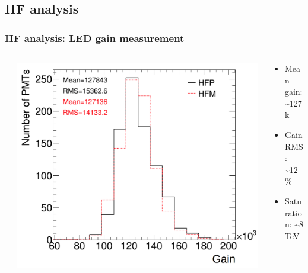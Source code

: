 \documentclass[bigger]{beamer}
\begin{document}
\subsection{HF analysis}
\label{sec-3-2}
\begin{frame}
\frametitle{HF analysis: LED gain measurement}
\label{sec-3-2-1}
\begin{columns} %
\label{sec-3-2-1-1}
\begin{column}{0.55\textwidth}
\label{sec-3-2-1-1-1}

\centering
\includegraphics[width=.9\linewidth]{fig/hf_local/hf_gain.png}
\end{column}
\begin{column}{0.55\textwidth}
\label{sec-3-2-1-1-2}
\begin{itemize}

\item Mean gain: \~{}127k
\label{sec-3-2-1-1-2-1}%

\item Gain RMS: \~{}12\%
\label{sec-3-2-1-1-2-2}%

\item Saturation: \~{}8 TeV
\label{sec-3-2-1-1-2-3}%
\end{itemize} %
\end{column}
\end{columns}
\end{frame}
\end{document}
